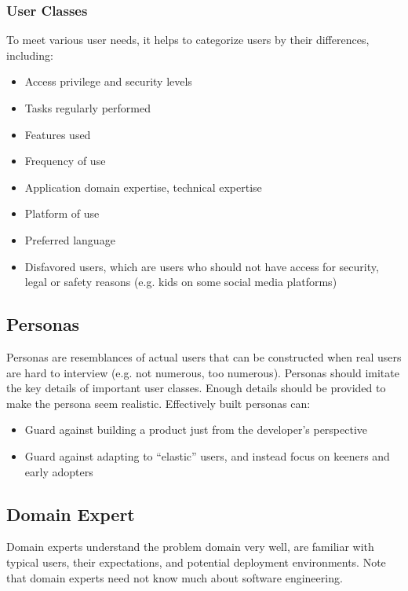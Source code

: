 \documentclass[12pt,titlepage]{article}
\begin{document}
      \subsubsection{User Classes}
        To meet various user needs, it helps to categorize users by their differences, including:
        \begin{itemize}
          \item Access privilege and security levels
          \item Tasks regularly performed
          \item Features used
          \item Frequency of use
          \item Application domain expertise, technical expertise
          \item Platform of use
          \item Preferred language
          \item Disfavored users, which are users who should not have access for security, legal or safety reasons (e.g. kids on some social media platforms)
        \end{itemize}

    \subsection{Personas}
      Personas are resemblances of actual users that can be constructed when real users are hard to interview (e.g. not numerous, too numerous). Personas
      should imitate the key details of important user classes. Enough details should be provided to make the persona seem realistic. Effectively built
      personas can:
      \begin{itemize}
        \item Guard against building a product just from the developer's perspective
        \item Guard against adapting to ``elastic'' users, and instead focus on keeners and early adopters
      \end{itemize}

    \subsection{Domain Expert}
      Domain experts understand the problem domain very well, are familiar with typical users, their expectations, and potential deployment environments.
      Note that domain experts need not know much about software engineering.
\end{document}
